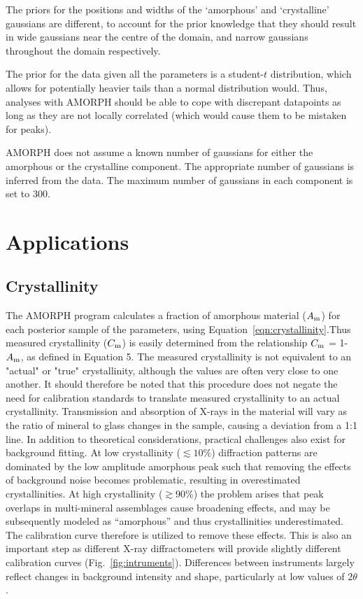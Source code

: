 \documentclass[preprint, a4paper]{elsarticle}
\begin{document}
The priors for the positions and widths of the `amorphous' and `crystalline'
gaussians are different, to account for the prior knowledge that they
should result in wide gaussians near the centre of the domain, and
narrow gaussians throughout the domain respectively.

The prior for the data given all the parameters is a student-$t$ distribution,
which allows for potentially heavier tails than a normal distribution would.
Thus, analyses with AMORPH should be able to cope with discrepant datapoints
as long as they are not locally correlated (which would cause them to be
mistaken for peaks).

AMORPH does not assume a known number of gaussians for either the
amorphous or the crystalline component. The appropriate number of
gaussians is inferred from the data. The maximum number of gaussians
in each component is set to 300.

\section{Applications}\label{sec:applications}
\subsection{Crystallinity}
The AMORPH program calculates a fraction of amorphous material ($A_{\rm m}$) for each posterior sample of the parameters,
using Equation~\ref{eqn:crystallinity}.Thus measured crystallinity ($C_{\rm m}$) is easily determined from the relationship $C_{\rm m}$ = 1-$A_{\rm m}$, as defined in Equation 5. The measured crystallinity is not equivalent to an "actual" or "true" crystallinity, although the values are often very close to one another.
It should therefore be noted that this procedure does not negate the need for calibration standards
to translate measured crystallinity to an actual crystallinity. Transmission and absorption of X-rays in the material will vary as the ratio of mineral to glass changes in the sample, causing a deviation from a 1:1 line. In addition to theoretical considerations, practical challenges also exist for background fitting. At low crystallinity ($\lesssim 10\%$) diffraction patterns are dominated by the low amplitude amorphous peak such that removing the effects of background noise becomes problematic, resulting in overestimated crystallinities. At high crystallinity ($\gtrsim 90\%$) the problem arises that peak overlaps in multi-mineral assemblages cause broadening effects, and may be subsequently modeled as ``amorphous'' and thus crystallinities  underestimated. The calibration curve therefore is utilized to remove these effects. This is also an important step as
different X-ray diffractometers will provide slightly different calibration curves (Fig.~\ref{fig:intruments}).
Differences between instruments largely reflect changes in background intensity and shape,
particularly at low values of $2\theta$. 
\end{document}
